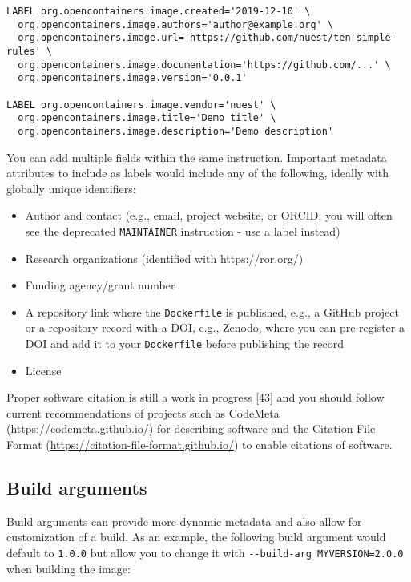 \documentclass[10pt,letterpaper]{article}
\providecommand{\tightlist}{%
  \setlength{\itemsep}{0pt}\setlength{\parskip}{0pt}}
\begin{document}
\begin{verbatim}
LABEL org.opencontainers.image.created='2019-12-10' \
  org.opencontainers.image.authors='author@example.org' \
  org.opencontainers.image.url='https://github.com/nuest/ten-simple-rules' \
  org.opencontainers.image.documentation='https://github.com/...' \
  org.opencontainers.image.version='0.0.1'

LABEL org.opencontainers.image.vendor='nuest' \
  org.opencontainers.image.title='Demo title' \
  org.opencontainers.image.description='Demo description'
\end{verbatim}

You can add multiple fields within the same instruction. Important
metadata attributes to include as labels would include any of the
following, ideally with globally unique identifiers:

\begin{itemize}
\tightlist
\item
  Author and contact (e.g., email, project website, or ORCID; you will
  often see the deprecated \texttt{MAINTAINER} instruction - use a label
  instead)
\item
  Research organizations (identified with https://ror.org/)
\item
  Funding agency/grant number
\item
  A repository link where the \texttt{Dockerfile} is published, e.g., a
  GitHub project or a repository record with a DOI, e.g., Zenodo, where
  you can pre-register a DOI and add it to your \texttt{Dockerfile}
  before publishing the record
\item
  License
\end{itemize}

Proper software citation is still a work in progress {[}43{]} and you
should follow current recommendations of projects such as CodeMeta
(\url{https://codemeta.github.io/}) for describing software and the
Citation File Format (\url{https://citation-file-format.github.io/}) to
enable citations of software.

\hypertarget{build-arguments}{%
\subsection{Build arguments}\label{build-arguments}}

Build arguments can provide more dynamic metadata and also allow for
customization of a build. As an example, the following build argument
would default to \texttt{1.0.0} but allow you to change it with
\texttt{-\/-build-arg\ MYVERSION=2.0.0} when building the image:
\end{document}
